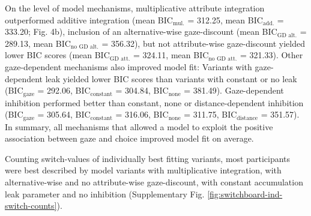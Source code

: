 \documentclass[11pt, a4paper]{article}
\begin{document}
On the level of model mechanisms, multiplicative attribute integration outperformed additive integration (mean BIC$_{\text{mul.}}$ = 312.25, mean BIC$_{\text{add.}}$ = 333.20; Fig. 4b), inclusion of an alternative-wise gaze-discount (mean BIC$_{\text{GD alt.}}$ = 289.13, mean BIC$_{\text{no GD alt.}}$  = 356.32), but not attribute-wise gaze-discount yielded lower BIC scores (mean BIC$_{\text{GD att.}}$  = 324.11, mean BIC$_{\text{no GD att.}}$ = 321.33). Other gaze-dependent mechanisms also improved model fit: Variants with gaze-dependent leak yielded lower BIC scores than variants with constant or no leak (BIC$_{\text{gaze}}$  = 292.06, BIC$_{\text{constant}}$ = 304.84, BIC$_{\text{none}}$ = 381.49). Gaze-dependent inhibition performed better than constant, none or distance-dependent inhibition (BIC$_{\text{gaze}}$ = 305.64, BIC$_{\text{constant}}$ = 316.06, BIC$_{\text{none}}$ = 311.75, BIC$_{\text{distance}}$ = 351.57). In summary, all mechanisms that allowed a model to exploit the positive association between gaze and choice improved model fit on average.

Counting switch-values of individually best fitting variants, most participants were best described by model variants with multiplicative integration, with alternative-wise and no attribute-wise gaze-discount, with constant accumulation leak parameter and no inhibition (Supplementary Fig. \ref{fig:switchboard-ind-switch-counts}).
\end{document}
